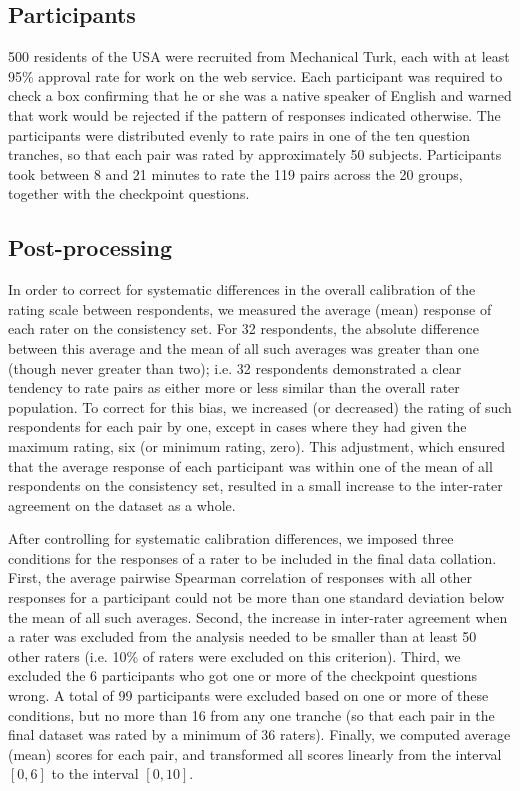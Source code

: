 \documentclass[fullname]{clv2}
\begin{document}
\subsection{Participants}

500 residents of the USA were recruited from Mechanical Turk, each with at least 95\% approval rate for work on the web service. Each participant was required to check a box confirming that he or she was a native speaker of English and warned that work would be rejected if the pattern of responses indicated otherwise. The participants were distributed evenly to rate pairs in one of the ten question tranches, so that each pair was rated by approximately 50 subjects. Participants took between 8 and 21 minutes to rate the 119 pairs across the 20 groups, together with the checkpoint questions. 

\subsection{Post-processing}

In order to correct for systematic differences in the overall calibration of the rating scale between respondents, we measured the average (mean) response of each rater on the consistency set. For 32 respondents, the absolute difference between this average and the mean of all such averages was greater than one (though never greater than two); i.e. 32 respondents demonstrated a clear tendency to rate pairs as either more or less similar than the overall rater population. To correct for this bias, we increased (or decreased) the rating of such respondents for each pair by one, except in cases where they had given the maximum rating, six (or minimum rating, zero). This adjustment, which ensured that the average response of each participant was within one of the mean of all respondents on the consistency set, resulted in a small increase to the inter-rater agreement on the dataset as a whole.     

After controlling for systematic calibration differences, we imposed three conditions for the responses of a rater to be included in the final data collation.  First, the average pairwise Spearman correlation of responses with all other responses for a participant could not be more than one standard deviation below the mean of all such averages. Second, the increase in inter-rater agreement when a rater was excluded from the analysis needed to be smaller than at least 50 other raters (i.e. 10\% of raters were excluded on this criterion). Third, we excluded the 6 participants who got one or more of the checkpoint questions wrong. A total of 99 participants were excluded based on one or more of these conditions, but no more than 16 from any one tranche (so that each pair in the final dataset was rated by a minimum of 36 raters). Finally, we computed average (mean) scores for each pair, and transformed all scores linearly from the interval \([0,6]\) to the interval \([0,10]\).
\end{document}
